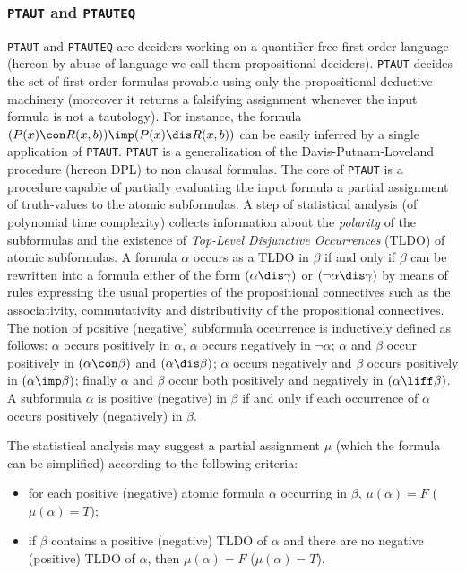 \subsubsection*{{\tt PTAUT} and {\tt PTAUTEQ}}
{\tt PTAUT} and {\tt PTAUTEQ}
are deciders working on a quantifier-free first order language (hereon by
abuse of language we call them propositional deciders).
{\tt PTAUT} decides the set of first order formulas provable using
only the propositional deductive machinery (moreover it returns a
falsifying assignment whenever the input formula is not a tautology).
For instance, the formula $(P(x)\con R(x,b))\imp (P(x)\dis R(x,b))$ can be
easily inferred by a single application of {\tt PTAUT}.
{\tt PTAUT} is a generalization of the Davis-Putnam-Loveland procedure
(hereon DPL) \cite{davis2,davis6} to non clausal formulas.
The core of {\tt PTAUT} is a procedure capable of partially evaluating
the input formula \wrt a partial assignment of truth-values to the atomic
subformulas. 
A step of statistical analysis (of polynomial time complexity) collects
information about the {\em polarity} of the subformulas and the existence
of {\em Top-Level Disjunctive Occurrences} (TLDO) of atomic subformulas.
A formula $\alpha$ occurs as a TLDO in $\beta$ 
if and only if $\beta$ can be rewritten into a formula either of the form
$(\alpha\dis\gamma)$ or $(\neg\alpha\dis\gamma)$ by means of rules
expressing  the usual properties of the propositional connectives such as
the associativity, commutativity and distributivity of the propositional
connectives.
The notion of positive (negative) subformula occurrence
is inductively defined as follows: $\alpha$ occurs positively in $\alpha$, 
$\alpha$ occurs negatively in $\neg\alpha$;
$\alpha$ and $\beta$ occur positively in $(\alpha\con\beta)$ and
$(\alpha\dis\beta)$;
$\alpha$ occurs negatively and $\beta$ occurs positively in $(\alpha\imp\beta)$;
finally $\alpha$ and $\beta$ occur both positively and negatively in
$(\alpha\liff\beta)$.
A subformula $\alpha$ is positive (negative) in $\beta$ if and only if
each occurrence of $\alpha$ occurs positively (negatively) in $\beta$.

The statistical analysis may suggest a partial assignment $\mu$ (\wrt which
the formula can be simplified) according to the following criteria:
\begin{itemize}
\item for each positive (negative) atomic formula $\alpha$ occurring
in $\beta$, $\mu(\alpha)=F$ ($\mu(\alpha)=T$);
\item if $\beta$ contains a positive (negative) TLDO of $\alpha$ and there
are no negative (positive) TLDO of $\alpha$, then $\mu(\alpha)=F$
($\mu(\alpha)=T$).
\end{itemize}

